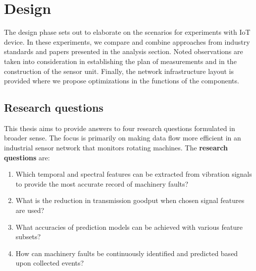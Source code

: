 \chapter{Design} \label{section:design}
The design phase sets out to elaborate on the scenarios for experiments with IoT device. In these experiments, we compare and combine approaches from industry standards and papers presented in the analysis section. Noted observations are taken into consideration in establishing the plan of measurements and in the construction of the sensor unit. Finally, the network infrastructure layout is provided where we propose optimizations in the functions of the components.

\section{Research questions}
This thesis aims to provide answers to four research questions formulated in broader sense. The focus is primarily on making data flow more efficient in an industrial sensor network that monitors rotating machines. The \textbf{research questions} are:
\begin{enumerate}[label=RQ\arabic*., font=\bfseries]
    \itemsep0pt
	\item Which temporal and spectral features can be extracted from vibration signals to provide the most accurate record of machinery faults?
	\item What is the reduction in transmission goodput when chosen signal features are used?
	\item What accuracies of prediction models can be achieved with various feature subsets?
	\item How can machinery faults be continuously identified and predicted based upon collected events?
\end{enumerate}

